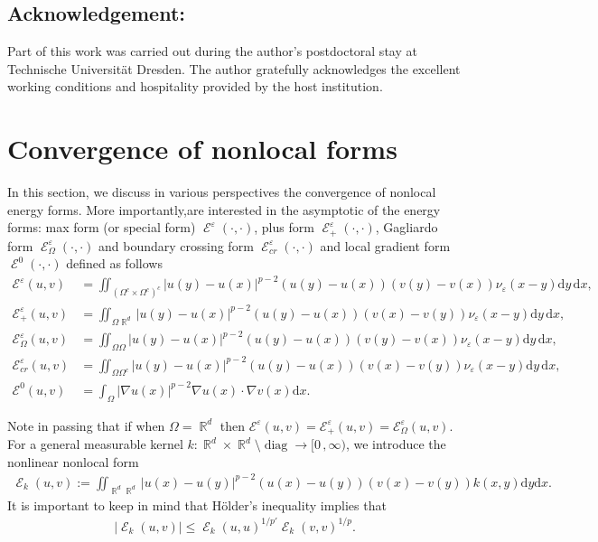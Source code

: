 \documentclass[12pt, reqno]{amsart}%
\theoremstyle{plain}  %
\theoremstyle{definition}  %
\numberwithin{equation}{section}
\DeclareMathOperator{\diag}{diag}
\DeclareMathOperator{\cE}{\mathcal{E}}
\DeclareMathOperator{\R}{\mathbb{R}}
\newcommand{\iil}{\iint}
\renewcommand{\d}{\mathrm{d}}
\newcommand{\eps}{\varepsilon}
\begin{document}
\subsection*{Acknowledgement:}
Part of this work was carried out during the author’s postdoctoral stay at Technische Universit{\"a}t Dresden. The author gratefully acknowledges the excellent working conditions and hospitality provided by the host institution.


\section{Convergence of nonlocal  forms} \label{sec:conv-nonloc-to-loc-forms}
In this section, we discuss in various perspectives the convergence of nonlocal energy forms.  More importantly,are interested in the asymptotic of the energy forms:  max form (or special form) $\cE^\eps(\cdot,\cdot)$,  plus form $\cE^\eps_+(\cdot,\cdot)$, Gagliardo form  $\cE^\eps_\Omega(\cdot,\cdot)$ and boundary crossing form  $\cE^\eps_{cr}(\cdot,\cdot)$ and local gradient form $\cE^0(\cdot,\cdot)$ defined as follows
\begin{align*}
\mathcal{E}^{\eps}(u,v) &= \iil_{(\Omega^c\times \Omega^c)^c} |u(y)-u(x)|^{p-2}(u(y)-u(x)) (v(y)-v(x) )\nu_\eps(x-y) \d y \, \d x,
\\ \mathcal{E}^{\eps}_+(u,v) &= \iil_{\Omega \R^d} |u(y)-u(x)|^{p-2}(u(y)-u(x))(v(x)-v(y))\nu_\eps(x-y)\d y \, \d x,
%
\\ \mathcal{E}^{\eps}_{\Omega}(u,v) &=  \iil_{\Omega \Omega} |u(y)-u(x)|^{p-2}(u(y)-u(x)) (v(y)-v(x)) \nu_\eps(x-y)\d y \, \d x, \\
\mathcal{E}^{\eps}_{cr}(u,v) &= \iil_{\Omega \Omega^c} |u(y)-u(x)|^{p-2}(u(y)-u(x))(v(x)-v(y))\nu_\eps(x-y)\d y \, \d x,
%
\\\mathcal{E}^{0}(u,v)&= \int_\Omega |\nabla u(x)|^{p-2}\nabla u(x)\cdot \nabla v(x)\d x.
\end{align*}

\noindent Note  in passing that if when $\Omega=\R^d$ then  $\mathcal{E}^{\eps}(u,v)= \mathcal{E}^{\eps}_+(u,v) =\mathcal{E}^{\eps}_{\Omega}(u,v)$. For a general  measurable kernel  $k:\R^d\times \R^d\setminus\diag \to [0\,, \infty)$,  we introduce the nonlinear nonlocal form
\begin{align*}
\cE_k (u, v):= \iil_{\R^d \R^d} |u(x)-u(y)|^{p-2}(u(x)-u(y)) (v(x)-v(y))k(x,y)\d y\d x.
\end{align*}
It is important to keep in mind that H\"older's inequality implies that
\begin{align}\label{eq:holder-form-estimate}
|\cE_k(u,v)|\leq \cE_k(u,u)^{1/p'}\cE_k(v,v)^{1/p}.
\end{align}
\end{document}
